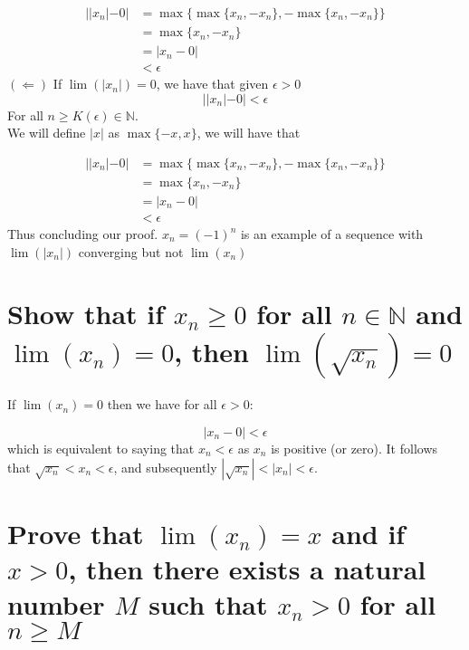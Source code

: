 \documentclass{article}
\begin{document}
\begin{align*}
    ||x_n| - 0| & = \max\{\max\{x_n, -x_n\}, -\max\{x_n, -x_n\}\} \\
                & = \max\{x_n, -x_n\} \\
                & = |x_n - 0| \\
                & < \epsilon
\end{align*} 
$(\Longleftarrow)$  If $\lim(|x_n|) = 0$, we have that given $\epsilon > 0$ 
\begin{equation*}
    ||x_n| - 0| < \epsilon 
\end{equation*}
For all $n \ge K(\epsilon) \in \mathbb{N}$.
\\
We will define $|x|$ as $\max\{-x, x\}$, we will have that

\begin{align*}
    ||x_n| - 0| & = \max\{\max\{x_n, -x_n\}, -\max\{x_n, -x_n\}\} \\
                & = \max\{x_n, -x_n\} \\
                & = |x_n - 0| \\
                & < \epsilon
\end{align*} 
Thus concluding our proof. $x_n = (-1)^n$ is an example of a sequence with $\lim(|x_n|)$ converging but not $\lim(x_n)$

\section{Show that if $x_n \ge 0$ for all $n \in \mathbb{N}$ and $\lim(x_n) = 0$, then $\lim(\sqrt{x_n}) = 0$}
If $\lim(x_n) = 0$ then we have for all $\epsilon > 0$:

\begin{equation*}
    |x_n - 0| < \epsilon
\end{equation*}
which is equivalent to saying that $x_n < \epsilon$ as $x_n$ is positive (or zero).
It follows that $\sqrt{x_n} < x_n < \epsilon$, and subsequently $|\sqrt{x_n}| < |x_n| < \epsilon$.

\section{Prove that $\lim(x_n) = x$ and if $x > 0$, then there exists a natural number $M$ such that $x_n > 0$ for all $n \ge M$}
\end{document}
